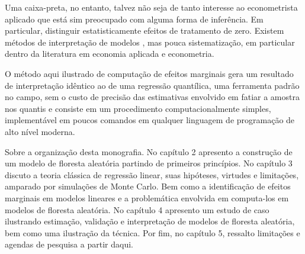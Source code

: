 Uma caixa-preta, no entanto, talvez não seja de tanto interesse ao econometrista aplicado que está sim preocupado com alguma forma de inferência. Em particular, distinguir estatisticamente efeitos de tratamento de zero. Existem métodos de interpretação de modelos \cite{ribeiro2016model}, mas pouca sistematização, em particular dentro da literatura em economia aplicada e econometria. 

O método aqui ilustrado de computação de efeitos marginais gera um resultado de interpretação idêntico ao de uma regressão quantílica, uma ferramenta padrão no campo, sem o custo de precisão das estimativas envolvido em fatiar a amostra nos quantis e consiste em um procedimento computacionalmente simples, implementável em poucos comandos em qualquer linguagem de programação de alto nível moderna. 

Sobre a organização desta monografia. No capítulo 2 apresento a construção de um modelo de floresta aleatória partindo de primeiros princípios. No capítulo 3 discuto a teoria clássica de regressão linear, suas hipóteses, virtudes e limitações, amparado por simulações de Monte Carlo. Bem como a identificação de efeitos marginais em modelos lineares e a problemática envolvida em computa-los em modelos de floresta aleatória. No capítulo 4 apresento um estudo de caso ilustrando estimação, validação e interpretação de modelos de floresta aleatória, bem como uma ilustração da técnica. Por fim, no capítulo 5, ressalto limitações e agendas de pesquisa a partir daqui.


